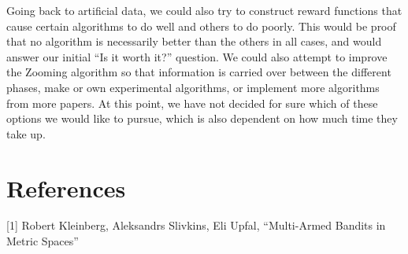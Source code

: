 \documentclass{article}
\begin{document}
Going back to artificial data, we could also try to construct reward
functions that cause certain algorithms to do well and others to do poorly.
This would be proof that no algorithm is necessarily better than the others
in all cases, and would answer our initial ``Is it worth it?'' question.
We could also attempt to improve the Zooming algorithm so that information
is carried over between the different phases, make or own experimental
algorithms, or implement more algorithms from more papers.  At this
point, we have not decided for sure which of these options we would like
to pursue, which is also dependent on how much time they take up.



\section*{References}


[1] Robert Kleinberg, Aleksandrs Slivkins, Eli Upfal, ``Multi-Armed Bandits in Metric Spaces''
\end{document}
